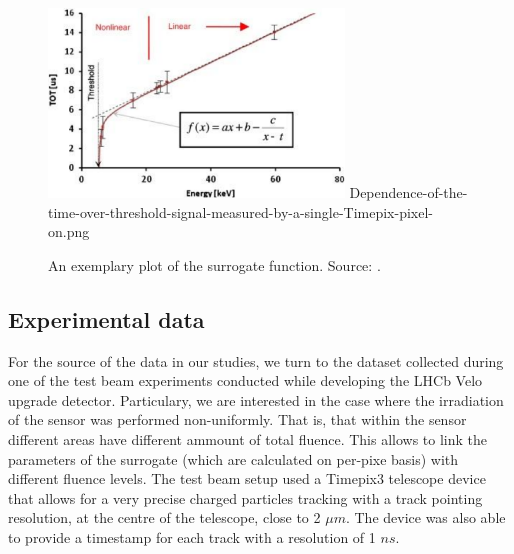 \begin{figure}[H]
\centering
\includegraphics[width=0.7\textwidth]{figures/chapter4/surrogates/Dependence-of-the-time-over-threshold-signal-measured-by-a-single-Timepix-pixel-on.png}
Dependence-of-the-time-over-threshold-signal-measured-by-a-single-Timepix-pixel-on.png
\caption{An exemplary plot of the surrogate function. Source: \cite{Platkevic:2013}.}
\label{fig:surrogate}
\end{figure}

\subsection{Experimental data}

For the source of the data in our studies, we turn to the dataset collected during one of the test beam \cite{Abba_2016} experiments conducted while developing the LHCb Velo upgrade detector.
Particulary, we are interested in the case where the irradiation of the sensor was performed non-uniformly. That is, that within the sensor different areas have different ammount of total fluence.
This allows to link the parameters of the surrogate (which are calculated on per-pixe basis) with different fluence levels.
The test beam  setup used a Timepix3 telescope device \cite{Akiba_2013} that allows for a very precise charged particles tracking with a track pointing resolution, at the centre of the telescope, close to 2 $\mu m$. The device was also able to provide a timestamp for each track with a resolution of 1 $ns$.

